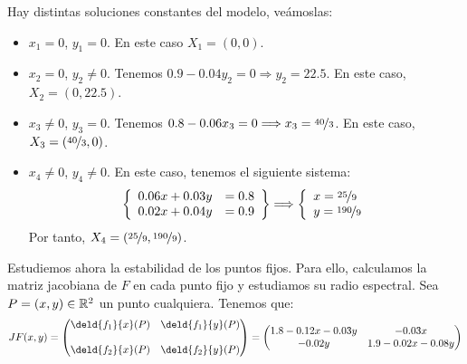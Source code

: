 \begin{ejercicio}
\begin{enumerate}
    Hay distintas soluciones constantes del modelo, veámoslas:
    \begin{itemize}
        \item $x_1=0$, $y_1=0$. En este caso $X_1=(0,0)$.
        \item $x_2=0$, $y_2\neq 0$. Tenemos $0.9-0.04y_2=0\Longrightarrow y_2=22.5$.
        En este caso, $X_2=(0,22.5)$.
        \item $x_3\neq 0$, $y_3=0$. Tenemos $0.8-0.06x_3=0\Longrightarrow x_3=\nicefrac{40}{3}$.
        En este caso, $X_3=(\nicefrac{40}{3},0)$.
        \item $x_4\neq 0$, $y_4\neq 0$. En este caso, tenemos el siguiente sistema:
        \begin{equation*}
            \left\{
                \begin{array}{lr}
                    0.06x + 0.03y &=0.8\\
                    0.02x + 0.04y &=0.9
                \end{array}
            \right\}
            \Longrightarrow
            \left\{
                \begin{array}{l}
                    x=\nicefrac{25}{9}\\
                    y=\nicefrac{190}{9}
                \end{array}
            \right.
        \end{equation*}
        Por tanto, $X_4=(\nicefrac{25}{9},\nicefrac{190}{9})$.
    \end{itemize}

    Estudiemos ahora la estabilidad de los puntos fijos. Para ello,
    calculamos la matriz jacobiana de $F$ en cada punto fijo y estudiamos
    su radio espectral. Sea $P=(x,y)\in \mathbb{R}^2$ un punto cualquiera. Tenemos que:
    \begin{equation*}
        JF(x,y) = \begin{pmatrix}
            \deld{f_1}{x}(P) & \deld{f_1}{y}(P)\\ \\
            \deld{f_2}{x}(P) & \deld{f_2}{y}(P)
        \end{pmatrix}
        = \begin{pmatrix}
            1.8-0.12x-0.03y & -0.03x\\
            -0.02y & 1.9-0.02x-0.08y
        \end{pmatrix}
    \end{equation*}


\end{enumerate}
\end{ejercicio}
